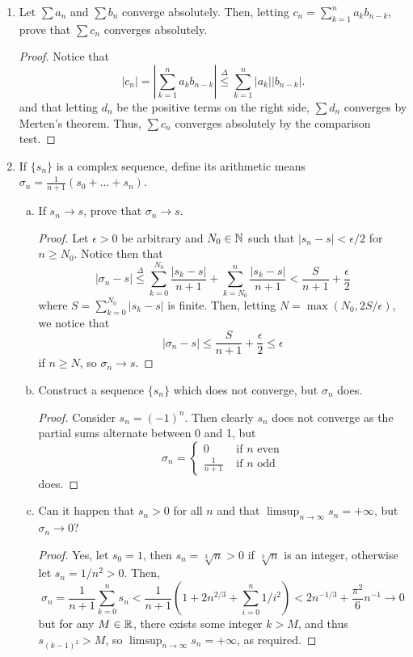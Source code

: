 \begin{enumerate}
\item %
Let $\sum a_n$ and $\sum b_n$ converge absolutely. Then, letting $c_n = \sum_{k=1}^{n} a_k b_{n-k}$, prove that $\sum c_n$ converges absolutely.

\begin{proof}
Notice that
\[
    |c_n| = \left| \sum_{k=1}^{n} a_k b_{n-k} \right| \overset{\Delta}{\le} \sum_{k=1}^{n} |a_k| |b_{n-k}|.    
\]
and that letting $d_n$ be the positive terms on the right side, $\sum d_n$ converges by Merten's theorem. Thus, $\sum c_n$ converges absolutely by the comparison test.
\end{proof}

\item %
If $\{s_n\}$ is a complex sequence, define its arithmetic means $\sigma_n = \frac{1}{n + 1} (s_0 + \dotsc + s_n)$. 
\begin{enumerate}[(a)]
\item If $s_n \to s$, prove that $\sigma_n \to s$.

\begin{proof}
    Let $\epsilon > 0$ be arbitrary and $N_0 \in \mathbb{N}$ such that $|s_n - s| < \epsilon/2$ for $n \ge N_0$. Notice then that 
    \[
        |\sigma_n - s| \overset{\Delta}{\le} \sum_{k=0}^{N_0} \frac{|s_k - s|}{n + 1} + \sum_{k=N_0}^{n} \frac{|s_k - s|}{n + 1} < \frac{S}{n + 1} + \frac{\epsilon}{2}
    \]
    where $S = \sum_{k=0}^{N_0} |s_k - s|$ is finite. Then, letting $N = \max(N_0, 2S/\epsilon)$, we notice that
    \[
        |\sigma_n - s| \le \frac{S}{n + 1} + \frac{\epsilon}{2} \le \epsilon
    \]
    if $n \ge N$, so $\sigma_n \to s$.
\end{proof}

\item Construct a sequence $\{s_n\}$ which does not converge, but $\sigma_n$ does. 

\begin{proof}
Consider $s_n = (-1)^{n}$. Then clearly $s_n$ does not converge as the partial sums alternate between 0 and 1, but
\[
    \sigma_n = \begin{cases}
        0 & \text{ if $n$ even} \\
        \frac{1}{n + 1} & \text{ if $n$ odd}
    \end{cases}
\]
does.
\end{proof}
\item Can it happen that $s_n > 0$ for all $n$ and that $\limsup_{n \to \infty} s_n = +\infty$, but $\sigma_n \to 0$?

\begin{proof}
    Yes, let $s_0 = 1$, then $s_n = \sqrt[3]{n} > 0$ if $\sqrt[3]{n}$ is an integer, otherwise let $s_n = 1/n^2 > 0$. Then,
    \[
        \sigma_n = \frac{1}{n + 1} \sum_{k=0}^{n} s_n < \frac{1}{n + 1} \left(1 + 2n^{2/3} + \sum_{i=0}^{n} 1/i^2 \right) < 2n^{-1/3} + \frac{\pi^2}{6}n^{-1} \to 0
    \]
    but for any $M \in \mathbb{R}$, there exists some integer $k > M$, and thus $s_{(k-1)^2} > M$, so $\limsup_{n \to \infty} s_n = +\infty$, as required.
\end{proof}


\end{enumerate}
\end{enumerate}
